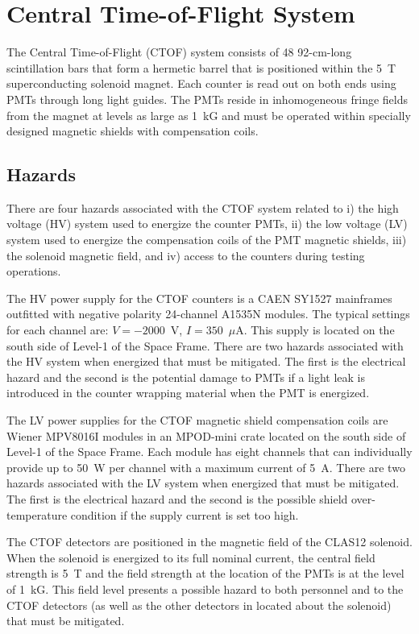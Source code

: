 \section{Central Time-of-Flight System}

The Central Time-of-Flight (CTOF) system consists of 48 92-cm-long scintillation bars 
that form a hermetic barrel that is positioned within the 5~T superconducting solenoid 
magnet. Each counter is read out on both ends using PMTs through long light guides. 
The PMTs reside in inhomogeneous fringe fields from the magnet at levels as large as 
1~kG and must be operated within specially designed magnetic shields with compensation 
coils.

\subsection{Hazards} 

There are four hazards associated with the CTOF system related to i) the high voltage (HV) 
system used to energize the counter PMTs, ii) the low voltage (LV) system used to energize 
the compensation coils of the PMT magnetic shields, iii) the solenoid magnetic field, and 
iv) access to the counters during testing operations.

The HV power supply for the CTOF counters is a CAEN SY1527 mainframes outfitted with 
negative polarity 24-channel A1535N modules. The typical settings for each channel are: 
$V=-2000$~V, $I=350$~$\mu$A. This supply is located on the south side of Level-1 of the 
Space Frame. There are two hazards associated with the HV system when energized that must 
be mitigated. The first is the electrical hazard and the second is the potential damage to 
PMTs if a light leak is introduced in the counter wrapping material when the PMT is energized.

The LV power supplies for the CTOF magnetic shield compensation coils are Wiener MPV8016I 
modules in an MPOD-mini crate located on the south side of Level-1 of the Space Frame. Each 
module has eight channels that can individually provide up to 50~W per channel with a maximum 
current of 5~A. There are two hazards associated with the LV system when energized that must 
be mitigated. The first is the electrical hazard and the second is the possible shield 
over-temperature condition if the supply current is set too high.

The CTOF detectors are positioned in the magnetic field of the CLAS12 solenoid. When the 
solenoid is energized to its full nominal current, the central field strength is 5~T and the 
field strength at the location of the PMTs is at the level of 1~kG. This field level presents 
a possible hazard to both personnel and to the CTOF detectors (as well as the other detectors 
in located about the solenoid) that must be mitigated.


